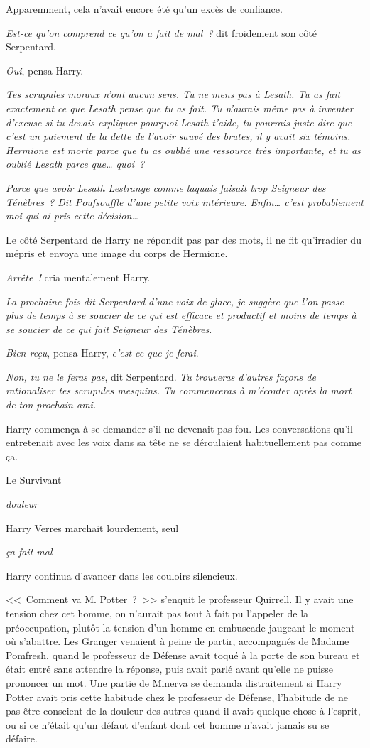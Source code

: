 Apparemment, cela n'avait encore été qu'un excès de confiance.

\emph{Est-ce qu'on comprend ce qu'on a fait de mal~?} dit froidement son côté Serpentard.

\emph{Oui}, pensa Harry.

\emph{Tes scrupules moraux n'ont aucun sens. Tu ne mens pas à Lesath. Tu as fait exactement ce que Lesath pense que tu as fait. Tu n'aurais même pas à inventer d'excuse si tu devais expliquer pourquoi Lesath t'aide, tu pourrais juste dire que c'est un paiement de la dette de l'avoir sauvé des brutes, il y avait six témoins. Hermione est morte parce que tu as oublié une ressource très importante, et tu as oublié Lesath parce que… quoi~?}

\emph{Parce que avoir Lesath Lestrange comme laquais faisait trop Seigneur des Ténèbres~? Dit Poufsouffle d'une petite voix intérieure. Enfin… c'est probablement moi qui ai pris cette décision…}

Le côté Serpentard de Harry ne répondit pas par des mots, il ne fit qu'irradier du mépris et envoya une image du corps de Hermione.

\emph{Arrête~!} cria mentalement Harry.

\emph{La prochaine fois dit Serpentard d'une voix de glace, je suggère que l'on passe plus de temps à se soucier de ce qui est efficace et productif et moins de temps à se soucier de ce qui fait Seigneur des Ténèbres.}

\emph{Bien reçu}, pensa Harry, \emph{c'est ce que je ferai}.

\emph{Non, tu ne le feras pas}, dit Serpentard. \emph{Tu trouveras d'autres façons de rationaliser tes scrupules mesquins. Tu commenceras à m'écouter après la mort de ton prochain ami.}

Harry commença à se demander s'il ne devenait pas fou. Les conversations qu'il entretenait avec les voix dans sa tête ne se déroulaient habituellement pas comme ça.

Le Survivant

\emph{douleur}

Harry Verres marchait lourdement, seul

\emph{ça fait mal}

Harry continua d'avancer dans les couloirs silencieux.

\later

<<~Comment va M. Potter~?~>> s'enquit le professeur Quirrell. Il y avait une tension chez cet homme, on n'aurait pas tout à fait pu l'appeler de la préoccupation, plutôt la tension d'un homme en embuscade jaugeant le moment où s'abattre. Les Granger venaient à peine de partir, accompagnés de Madame Pomfresh, quand le professeur de Défense avait toqué à la porte de son bureau et était entré sans attendre la réponse, puis avait parlé avant qu'elle ne puisse prononcer un mot. Une partie de Minerva se demanda distraitement si Harry Potter avait pris cette habitude chez le professeur de Défense, l'habitude de ne pas être conscient de la douleur des autres quand il avait quelque chose à l'esprit, ou si ce n'était qu'un défaut d'enfant dont cet homme n'avait jamais su se défaire.


